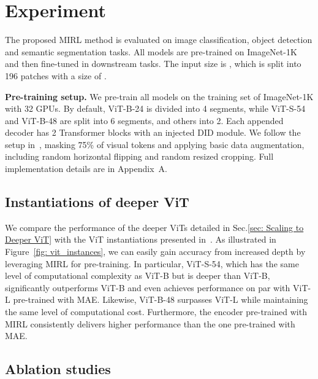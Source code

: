 \documentclass{article}
\begin{document}
\vspace{5pt}
\section{Experiment}
\vspace{5pt}
The proposed MIRL method is evaluated on image classification, object detection and semantic segmentation tasks. All models are pre-trained on ImageNet-1K and then fine-tuned in downstream tasks. 
The input size is , which is split into 196 patches with a size of .



\textbf{Pre-training setup.} We pre-train all models on the training set of ImageNet-1K with 32 GPUs.
By default, ViT-B-24 is divided into 4 segments, while ViT-S-54 and ViT-B-48 are split into 6 segments, and others into 2. Each appended decoder has 2 Transformer blocks with an injected DID module. We follow the setup in~\cite{he2022masked}, masking 75\% of visual tokens and applying basic data augmentation, including random horizontal flipping and random resized cropping. Full implementation details are in Appendix~A.





\subsection{Instantiations of deeper ViT}
\label{sec: Instantiations of deeper ViT}
We compare the performance of the deeper ViTs detailed in Sec.\ref{sec: Scaling to Deeper ViT} with the ViT instantiations presented in~\cite{dosovitskiy2020image}. As illustrated in Figure~\ref{fig: vit_instances}, we can easily gain accuracy from increased depth by leveraging MIRL for pre-training. In particular, 
ViT-S-54, which has the same level of computational complexity as ViT-B but is  deeper than ViT-B, significantly outperforms ViT-B and even achieves performance on par with ViT-L pre-trained with MAE. Likewise, ViT-B-48 surpasses ViT-L while maintaining the same level of computational cost. Furthermore, the encoder pre-trained with MIRL consistently delivers higher performance than the one pre-trained with MAE. 

\vspace{5pt}
\subsection{Ablation studies}
\label{sec: Ablation Studies}
\vspace{5pt}
\end{document}
